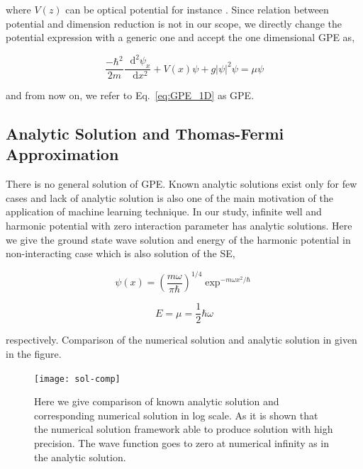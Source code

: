 \documentclass[a4paper,times,hidelinks,12pt]{article}
\newcommand*\dif{\mathop{}\!\mathrm{d}}
\begin{document}
\noindent where $V(z)$ can be optical potential for instance \cite{zheng2013dynamics}. Since relation between potential and dimension reduction is not in our scope, we directly change the potential expression with a generic one and accept the one dimensional GPE as,

\begin{equation}
    \label{eq:GPE_1D}
    \frac{-\hbar^2}{2m}\frac{\dif^2\psi_x}{\dif x^2} + V(x)\psi + g|\psi|^2\psi = \mu\psi
\end{equation}

\noindent and from now on, we refer to Eq.~\eqref{eq:GPE_1D} as GPE.

\subsection{Analytic Solution and Thomas-Fermi Approximation}

There is no general solution of GPE. Known analytic solutions exist only for few cases and lack of analytic solution is also one of the main motivation of the application of machine learning technique. In our study, infinite well and harmonic potential with zero interaction parameter has analytic solutions. Here we give the ground state wave solution and energy of the harmonic potential in non-interacting case which is also solution of the SE,

\begin{equation}
\label{eq:harmonic_ground_state_wave}
    \psi(x) = (\frac{m\omega}{\pi\hbar})^{1/4}\exp^{-m\omega x^2/\hbar}
\end{equation}

\begin{equation}
\label{eq:GPE_1D_solution_harmonic}
    E = \mu = \frac{1}{2}\hbar\omega
\end{equation}

\noindent respectively. Comparison of the numerical solution and analytic solution in given in the figure.

\graphicspath{{"../figs/numericanalyze/"}}
\begin{figure}[H]
\centering
    \texttt{[image: sol-comp]}
\caption{Here we give comparison of known analytic solution and corresponding numerical solution in log scale. As it is shown that the numerical solution framework able to produce solution with high precision. The wave function goes to zero at numerical infinity as in the analytic solution.}
\label{fig:dens_energy_error}
\end{figure}
\end{document}
